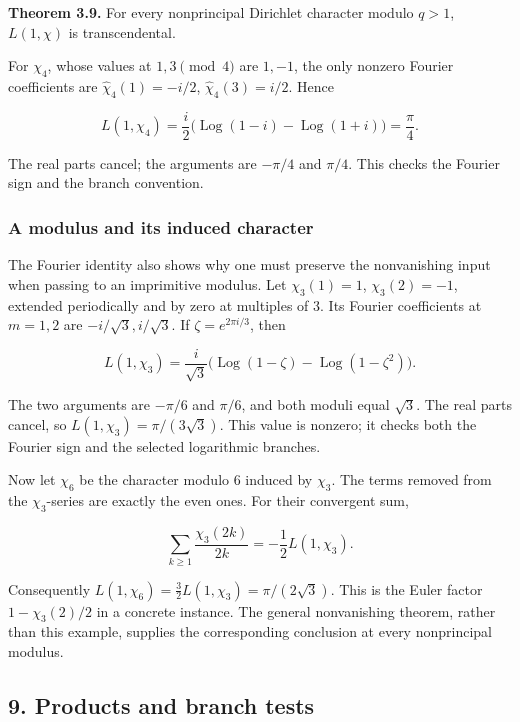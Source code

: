 \documentclass[
  11pt,
  a4paper,
]{article}
\begin{document}
\textbf{Theorem 3.9.} For every nonprincipal Dirichlet character modulo
\(q>1\), \(L(1,\chi)\) is transcendental.

For \(\chi_4\), whose values at \(1,3\pmod4\) are \(1,-1\), the only
nonzero Fourier coefficients are \(\widehat\chi_4(1)=-i/2\),
\(\widehat\chi_4(3)=i/2\). Hence

\[
L(1,\chi_4)=\frac i2\bigl(\operatorname{Log}(1-i)-\operatorname{Log}(1+i)\bigr)=\frac\pi4.
\]

The real parts cancel; the arguments are \(-\pi/4\) and \(\pi/4\). This
checks the Fourier sign and the branch convention.

\subsubsection{A modulus and its induced
character}\label{a-modulus-and-its-induced-character}

The Fourier identity also shows why one must preserve the nonvanishing
input when passing to an imprimitive modulus. Let \(\chi_3(1)=1\),
\(\chi_3(2)=-1\), extended periodically and by zero at multiples of
\(3\). Its Fourier coefficients at \(m=1,2\) are \(-i/\sqrt3,i/\sqrt3\).
If \(\zeta=e^{2\pi i/3}\), then

\[
L(1,\chi_3)=\frac{i}{\sqrt3}
\bigl(\operatorname{Log}(1-\zeta)-\operatorname{Log}(1-\zeta^2)\bigr).
\]

The two arguments are \(-\pi/6\) and \(\pi/6\), and both moduli equal
\(\sqrt3\). The real parts cancel, so \(L(1,\chi_3)=\pi/(3\sqrt3)\).
This value is nonzero; it checks both the Fourier sign and the selected
logarithmic branches.

Now let \(\chi_6\) be the character modulo \(6\) induced by \(\chi_3\).
The terms removed from the \(\chi_3\)-series are exactly the even ones.
For their convergent sum,

\[
\sum_{k\ge1}\frac{\chi_3(2k)}{2k}
=-\frac12L(1,\chi_3).
\]

Consequently \(L(1,\chi_6)=\tfrac32L(1,\chi_3)=\pi/(2\sqrt3)\). This is
the Euler factor \(1-\chi_3(2)/2\) in a concrete instance. The general
nonvanishing theorem, rather than this example, supplies the
corresponding conclusion at every nonprincipal modulus.

\subsection{9. Products and branch
tests}\label{products-and-branch-tests}
\end{document}
